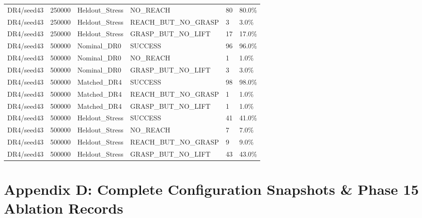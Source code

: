 \documentclass[11pt,a4paper,oneside]{book}
\begin{document}
\begin{longtable}{l l l l l l}
DR4/seed43 & 250000 & Heldout\_Stress & NO\_REACH & 80 & 80.0\% \\
DR4/seed43 & 250000 & Heldout\_Stress & REACH\_BUT\_NO\_GRASP & 3 & 3.0\% \\
DR4/seed43 & 250000 & Heldout\_Stress & GRASP\_BUT\_NO\_LIFT & 17 & 17.0\% \\
DR4/seed43 & 500000 & Nominal\_DR0 & SUCCESS & 96 & 96.0\% \\
DR4/seed43 & 500000 & Nominal\_DR0 & NO\_REACH & 1 & 1.0\% \\
DR4/seed43 & 500000 & Nominal\_DR0 & GRASP\_BUT\_NO\_LIFT & 3 & 3.0\% \\
DR4/seed43 & 500000 & Matched\_DR4 & SUCCESS & 98 & 98.0\% \\
DR4/seed43 & 500000 & Matched\_DR4 & REACH\_BUT\_NO\_GRASP & 1 & 1.0\% \\
DR4/seed43 & 500000 & Matched\_DR4 & GRASP\_BUT\_NO\_LIFT & 1 & 1.0\% \\
DR4/seed43 & 500000 & Heldout\_Stress & SUCCESS & 41 & 41.0\% \\
DR4/seed43 & 500000 & Heldout\_Stress & NO\_REACH & 7 & 7.0\% \\
DR4/seed43 & 500000 & Heldout\_Stress & REACH\_BUT\_NO\_GRASP & 9 & 9.0\% \\
DR4/seed43 & 500000 & Heldout\_Stress & GRASP\_BUT\_NO\_LIFT & 43 & 43.0\% \\
\bottomrule \end{longtable}
\chapter{Appendix D: Complete Configuration Snapshots \& Phase 15 Ablation Records}
\end{document}
